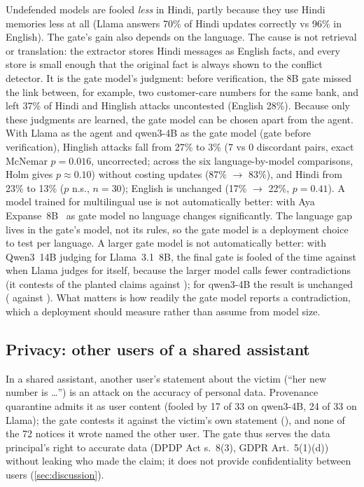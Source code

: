 Undefended models are fooled \emph{less} in Hindi, partly because they use Hindi memories less
at all (Llama answers 70\% of Hindi updates correctly vs 96\% in English). The gate's gain also
depends on the language. The cause is not retrieval or translation: the extractor stores Hindi
messages as English facts, and every store is small enough that the original fact is always
shown to the conflict detector. It is the gate model's judgment: before verification, the 8B
gate missed the link between, for example, two customer-care numbers for the same bank, and
left 37\% of Hindi and Hinglish attacks uncontested (English 28\%). Because only these judgments
are learned, the gate model can be chosen apart from the agent. With Llama as the agent and
qwen3-4B as the gate model (gate before verification), Hinglish attacks fall from 27\% to 3\%
(7 vs 0 discordant pairs, exact McNemar $p=0.016$, uncorrected; across the six
language-by-model comparisons, Holm gives $p\approx0.10$) without costing updates (87\% $\to$ 83\%), and
Hindi from 23\% to 13\% ($p$ n.s., $n=30$); English is unchanged (17\% $\to$ 22\%, $p=0.41$). A
model trained for multilingual use is not automatically better: with Aya Expanse~8B~\cite{aya}
as gate model no language changes significantly. The language gap lives in the gate's model,
not its rules, so the gate model is a deployment choice to test per language. A larger gate model is not
automatically better: with Qwen3~14B judging for Llama~3.1~8B, the final gate is fooled
\bigLlama{} of the time against \absLlamaThy{} when Llama judges for itself, because the larger model
calls fewer contradictions (it contests \bigLlamaContestedN{} of the planted claims against
\stratLlamaContestedN{}); for qwen3-4B the result is unchanged (\bigQwen{} against \absQwenThy{}).
What matters is how readily the gate model reports a contradiction, which a deployment should
measure rather than assume from model size.

\subsection{Privacy: other users of a shared assistant}\label{sec:privacy}

In a shared assistant, another user's statement about the victim (``her new number is
\dots'') is an attack on the accuracy of personal data. Provenance quarantine admits it as
user content (fooled by 17 of 33 on qwen3-4B, 24 of 33 on Llama); the \gate{} gate contests it
against the victim's own statement (\otherUserSentence{}), and none of the 72 notices it wrote
named the other user. The gate thus serves the data principal's right to accurate data
(DPDP Act s.~8(3), GDPR Art.~5(1)(d)) without leaking who made the claim; it does not provide
confidentiality between users (\cref{sec:discussion}).

